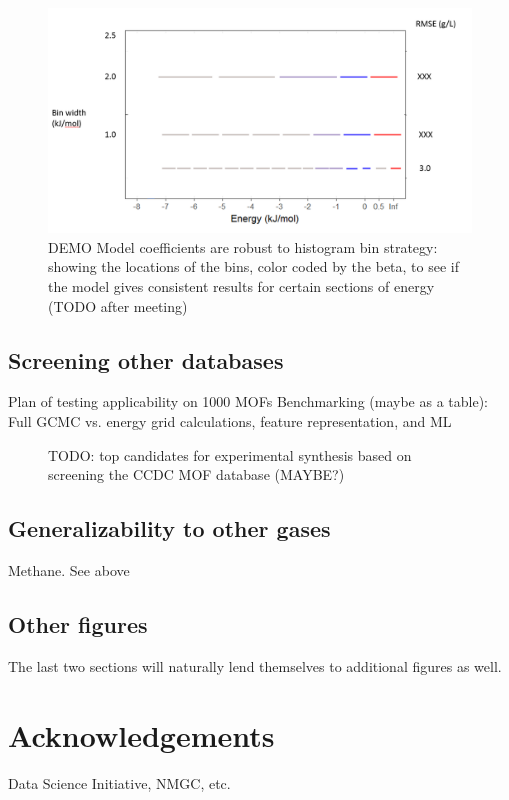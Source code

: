 \documentclass[letterpaper]{article}
\begin{document}
\begin{figure}[H]
	\centering
	\includegraphics[width=0.75\columnwidth]{Figs/beta_robustness.png}
	\caption{DEMO Model coefficients are robust to histogram bin strategy: showing the locations of the bins, color coded by the beta, to see if the model gives consistent results for certain sections of energy (TODO after meeting)}
	\label{fig:binwidth}
\end{figure}

\subsection{Screening other databases}
\begin{outline}
	\1 Plan of testing applicability on 1000 MOFs
	\1 Benchmarking (maybe as a table): Full GCMC vs. energy grid calculations, feature representation, and ML
\end{outline}
\begin{figure}[H]
	\centering
	\caption{TODO: top candidates for experimental synthesis based on screening the CCDC MOF database (MAYBE?)}
	\label{fig:candidates}
\end{figure}

\subsection{Generalizability to other gases}
\begin{outline}
	\1 Methane. See above
\end{outline}

\subsection{Other figures}
The last two sections will naturally lend themselves to additional figures as well.

\section{Acknowledgements}
Data Science Initiative, NMGC, etc.
\end{document}
